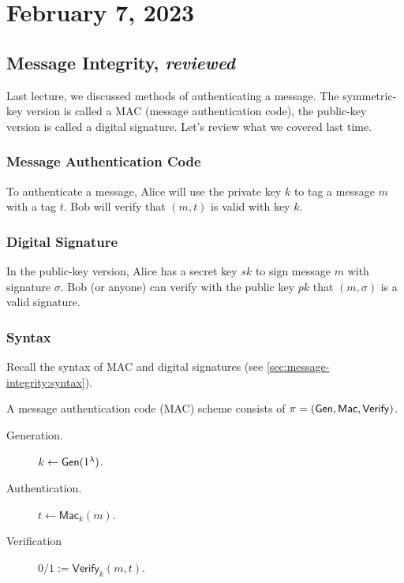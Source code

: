 \section{February 7, 2023}
\label{20230207}
\subsection{Message Integrity, \emph{reviewed}}

Last lecture, we discussed methods of authenticating a message. The symmetric-key version is called a MAC (message authentication code), the public-key version is called a digital signature. Let's review what we covered last time.

\subsubsection{Message Authentication Code}
To authenticate a message, Alice will use the private key $k$ to tag a message $m$ with a tag $t$. Bob will verify that $(m, t)$ is valid with key $k$.


\subsubsection{Digital Signature}
In the public-key version, Alice has a secret key $sk$ to sign message $m$ with signature $\sigma$. Bob (or anyone) can verify with the public key $pk$ that $(m, \sigma)$ is a valid signature.


\subsubsection{Syntax}
Recall the syntax of MAC and digital signatures (see \cref{sec:message-integrity:syntax}).

A message authentication code (MAC) scheme consists of $\pi = (\operatorname{\mathsf{Gen}}, \mathsf{Mac}, \mathsf{Verify})$.
\begin{description}
    \item[Generation.] $k\leftarrow \operatorname{\mathsf{Gen}}(1^\lambda)$.
    \item[Authentication.] $t \leftarrow \mathsf{Mac}_k(m)$.
    \item[Verification] $0/1 := \mathsf{Verify}_k(m, t)$.
\end{description}

